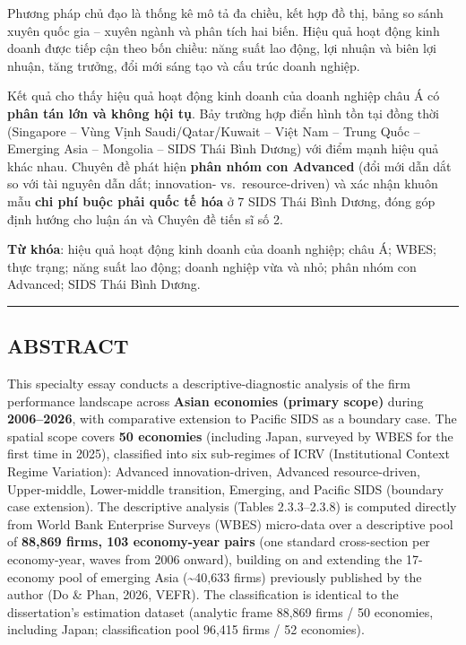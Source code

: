 \documentclass[
  a4paper,
  13pt]{extreport}
\begin{document}
Phương pháp chủ đạo là thống kê mô tả đa chiều, kết hợp đồ thị, bảng so
sánh xuyên quốc gia -- xuyên ngành và phân tích hai biến. Hiệu quả hoạt
động kinh doanh được tiếp cận theo bốn chiều: năng suất lao động, lợi
nhuận và biên lợi nhuận, tăng trưởng, đổi mới sáng tạo và cấu trúc doanh
nghiệp.

Kết quả cho thấy hiệu quả hoạt động kinh doanh của doanh nghiệp châu Á
có \textbf{phân tán lớn và không hội tụ}. Bảy trường hợp điển hình tồn
tại đồng thời (Singapore -- Vùng Vịnh Saudi/Qatar/Kuwait -- Việt Nam --
Trung Quốc -- Emerging Asia -- Mongolia -- SIDS Thái Bình Dương) với
điểm mạnh hiệu quả khác nhau. Chuyên đề phát hiện \textbf{phân nhóm con
Advanced} (đổi mới dẫn dắt so với tài nguyên dẫn dắt; innovation-
vs.~resource-driven) và xác nhận khuôn mẫu \textbf{chi phí buộc phải
quốc tế hóa} ở 7 SIDS Thái Bình Dương, đóng góp định hướng cho luận án
và Chuyên đề tiến sĩ số 2.

\textbf{Từ khóa}: hiệu quả hoạt động kinh doanh của doanh nghiệp; châu
Á; WBES; thực trạng; năng suất lao động; doanh nghiệp vừa và nhỏ; phân
nhóm con Advanced; SIDS Thái Bình Dương.

\begin{center}\rule{0.5\linewidth}{0.5pt}\end{center}

\hypertarget{abstract}{%
\subsection{ABSTRACT}\label{abstract}}

This specialty essay conducts a descriptive-diagnostic analysis of the
firm performance landscape across \textbf{Asian economies (primary
scope)} during \textbf{2006--2026}, with comparative extension to
Pacific SIDS as a boundary case. The spatial scope covers \textbf{50
economies} (including Japan, surveyed by WBES for the first time in
2025), classified into six sub-regimes of ICRV (Institutional Context
Regime Variation): Advanced innovation-driven, Advanced resource-driven,
Upper-middle, Lower-middle transition, Emerging, and Pacific SIDS
(boundary case extension). The descriptive analysis (Tables
2.3.3--2.3.8) is computed directly from World Bank Enterprise Surveys
(WBES) micro-data over a descriptive pool of \textbf{88,869 firms, 103
economy-year pairs} (one standard cross-section per economy-year, waves
from 2006 onward), building on and extending the 17-economy pool of
emerging Asia (\textasciitilde40,633 firms) previously published by the
author (Do \& Phan, 2026, VEFR). The classification is identical to the
dissertation's estimation dataset (analytic frame 88,869 firms / 50
economies, including Japan; classification pool 96,415 firms / 52
economies).
\end{document}
